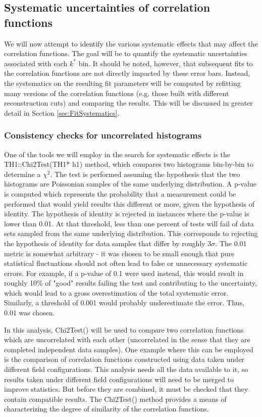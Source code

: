 \subsection{Systematic uncertainties of correlation functions}
\label{sec:SysUncertaintyCF}

We will now attempt to identify the various systematic effects that may affect the correlation functions.  
The goal will be to quantify the systematic uncertainties associated with each $k^*$ bin.  
It should be noted, however, that subsequent fits to the correlation functions are not directly impacted by these error bars.  
Instead, the systematics on the resulting fit parameters will be computed by refitting many versions of the correlation functions (e.g. those built with different reconstruction cuts) and comparing the results. 
This will be discussed in greater detail in Section \ref{sec:FitSystematics}.

\subsubsection{Consistency checks for uncorrelated histograms}
\label{sec:ConsistencyCheckUncorrelated}
One of the tools we will employ in the search for systematic effects is the TH1::Chi2Test(TH1* h1) method, which compares two histograms bin-by-bin to determine a $\chi^2$.  
The test is performed assuming the hypothesis that the two histograms are Poissonian samples of the same underlying distribution.  
A p-value is computed which represents the probability that a measurement could be performed that would yield results this different or more, given the hypothesis of identity.  
The hypothesis of identity is rejected in instances where the p-value is lower than 0.01. 
At that threshold, less than one percent of tests will fail of data sets sampled from the same underlying distribution.  
This corresponds to rejecting the hypothesis of identity for data samples that differ by roughly $3 \sigma$.  
The 0.01 metric is somewhat arbitrary - it was chosen to be small enough that pure statistical fluctuations should not often lead to false or unnecessary systematic errors.  
For example, if a p-value of 0.1 were used instead, this would result in roughly 10\% of "good" results failing the test and contributing to the uncertainty, which would lead to a gross overestimation of the total systematic error.  
Similarly, a threshold of 0.001 would probably underestimate the error.  
Thus, 0.01 was chosen.

In this analysis, Chi2Test() will be used to compare two correlation functions which are uncorrelated with each other (uncorrelated in the sense that they are completed independent data samples).  
One example where this can be employed is the comparison of correlation functions constructed using data taken under different field configurations.  
This analysis needs all the data available to it, so results taken under different field configurations will need to be merged to improve statistics.  
But before they are combined, it must be checked that they contain compatible results.  
The Chi2Test() method provides a means of characterizing the degree of similarity of the correlation functions.  


